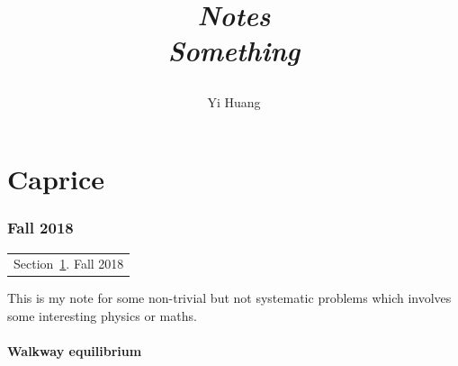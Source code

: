\documentclass[10pt]{article}
\title{\begin{center}{\Huge \textit{Notes}}\\{{\itshape Something}}\end{center}}
\author{Yi Huang}
\affiliation{
University of Minnesota
}
\begin{document}
	\maketitle
	\flushbottom
	\newpage
	\pagestyle{fancynotes}
	\part{Caprice}
	\section{Fall 2018}\label{sec:fall2018}
	\begin{margintable}\vspace{.8in}\footnotesize
		\begin{tabularx}{\marginparwidth}{|X}
		Section~\ref{sec:fall2018}. Fall 2018\\
		\end{tabularx}
	\end{margintable}

	This is my note for some non-trivial but not systematic problems which involves some interesting physics or maths.

	\subsection{Walkway equilibrium}
\end{document}
